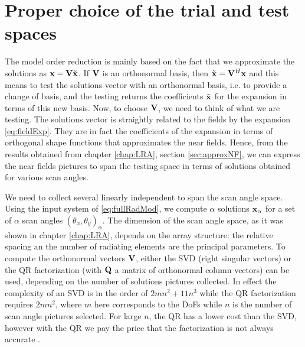 \section{Proper choice of the trial and test spaces}

\par The model order reduction is mainly based on the fact that we approximate the solutions as $\vect x = \mat V \tilde{\vect x}$. If $\mathbf{V}$ is an orthonormal basis, then $\tilde{\vect x} =  \mat{V}^H \vect x$ and this means to test the solutions vector with an orthonormal basis, i.e. to provide a change of basis, and the testing returns the coefficients $\tilde{\vect x}$ for the expansion in terms of this new basis. Now, to choose $\mathbf{V}$, we need to think of what we are testing. The solutions vector is straightly related to the fields by the expansion \eqref{eq:fieldExp}. They are in fact the coefficients of the expansion in terms of orthogonal shape functions that approximates the near fields. Hence, from the results obtained from chapter \ref{chap:LRA}, section \ref{sec:approxNF}, we can express the near fields pictures to span the testing space in terms of solutions obtained for various scan angles.

\par We need to collect several linearly independent  to span the scan angle space. Using the input system of \eqref{eq:fullRadMod}, we compute $\alpha$ solutions $\vect{x}_\alpha$ for a set of $\alpha$ scan angles $(\theta_x, \theta_y)_\alpha$. The dimension of the scan angle space, as it was shown in chapter \ref{chap:LRA}, depends on the array structure: the relative spacing an the number of radiating elements are the principal parameters. To compute the orthonormal vectors $\mathbf{V}$, either the SVD (right singular vectors) or the QR factorization (with $\mathbf{Q}$ a matrix of orthonormal column vectors) \cite{TrefethenBauNLA} can be used, depending on the number of solutions pictures collected. In effect the complexity of an SVD is in the order of \texttildelow $2 m n^2 + 11 n^3$ while the QR factorization requires \texttildelow $2 m n^2$, where $m$ here corresponds to the DoFs while $n$ is the number of scan angle pictures selected. For large $n$, the QR has a lower cost than the SVD, however with the QR we pay the price that the factorization is not always accurate \cite{TrefethenBauNLA}.

